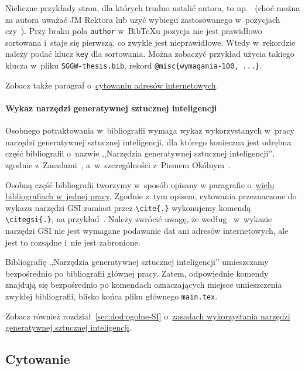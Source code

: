 Nieliczne przykłady stron, dla których trudno ustalić autora, to np.~ (choć można za autora uważać JM Rektora lub użyć wybiegu zastosowanego w~pozycjach~ czy~). Przy braku pola {\tt author} w~Bib\TeX{}u pozycja nie jest prawidłowo sortowana i~staje się pierwszą, co zwykle jest nieprawidłowe. Wtedy w~rekordzie należy podać klucz {\tt key} dla sortowania. Można zobaczyć przykład użycia takiego klucza w~pliku {\tt SGGW-thesis.bib}, rekord {\tt @misc\{wymagania-100, ...\}}.

Zobacz także paragraf o~\hyperref[sec:dod:cytowanie-url]{cytowaniu adresów internetowych}.


\paragraph{Wykaz narzędzi generatywnej sztucznej inteligencji}
\label{sec:dod:bibliografia-SI}

Osobnego po\-trak\-to\-wa\-nia w~bibliografii wymaga wykaz wykorzystanych w~pracy narzędzi generatywnej sztucznej inteligencji, dla którego konieczna jest odrębna część bibliografii o~nazwie ,,Narzędzia generatywnej sztucznej inteligencji'', zgodnie z~Zasadami~, a~w~szczególności z~Pismem Okólnym~. 

Osobną część bibliografii tworzymy w~sposób opisany w paragrafie o~\hyperref[sec:dod:bibliografia-wiele]{wielu bibliografiach w~jednej pracy}. Zgodnie z~tym opisem, cytowania przeznaczone do wykazu narzędzi GSI zamiast przez \verb+\cite{.}+ wykonujemy komendą \verb+\citegsi{.}+, na przykład~. Należy zwrócić uwagę, że według~ w~wykazie narzędzi GSI nie jest wymagane podawanie dat ani adresów internetowych, ale jest to rozsądne i~nie jest zabronione.

Bibliografię ,,Narzędzia generatywnej sztucznej inteligencji'' umieszczamy bezpośrednio po bibliografii głównej pracy. Zatem, odpowiednie komendy znajdują się bezpośrednio po komendach oznaczających miejsce umieszczenia zwykłej bibliografii, blisko końca pliku głównego {\tt main.tex}. 

Zobacz również rozdział~\ref{sec:dod:ogolne-SI} o~\hyperref[sec:dod:ogolne-SI]{zasadach wykorzystania narzędzi generatywnej sztucznej inteligencji}.


\subsection{Cytowanie}
\label{sec:dod:cytowanie}

